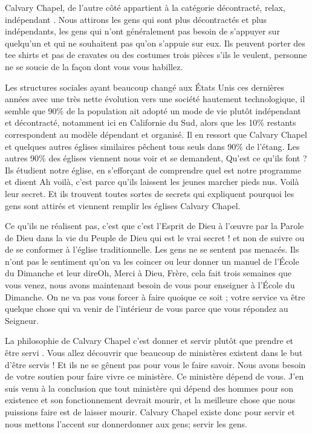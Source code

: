 Calvary Chapel, de l’autre côté appartient à la catégorie \og décontracté, relax, indépendant \fg{}. Nous attirons les gens qui
sont plus décontractés et plus indépendants, les gens qui n’ont généralement pas besoin de s’appuyer sur quelqu’un
et qui ne souhaitent pas qu’on s’appuie sur eux. Ils peuvent porter des tee shirts et pas de cravates ou des costumes
trois pièces s’ils le veulent, personne ne se soucie de la façon dont vous vous habillez.

Les structures sociales ayant beaucoup changé aux États Unis ces dernières années avec une très nette évolution vers
une société hautement technologique, il semble que 90\% de la population ait adopté un mode de vie plutôt
indépendant et décontracté, notamment ici en Californie du Sud, alors que les 10\% restants correspondent au modèle
dépendant et organisé. Il en ressort que Calvary Chapel et quelques autres églises similaires pêchent tous seuls dans
90\% de l'étang. Les autres 90\% des églises viennent nous voir et se demandent, \og Qu’est ce qu’ils font ?\fg{} Ils étudient
notre église, en s’efforçant de comprendre quel est notre programme et disent \og Ah voilà, c’est parce qu’ils laissent les
jeunes marcher pieds nus. Voilà leur secret. \fg{} Et ils trouvent toutes sortes de \og secrets\fg{} qui expliquent pourquoi les
gens sont attirés et viennent remplir les églises Calvary Chapel.

Ce qu’ils ne réalisent pas, c’est que c’est l’Esprit de Dieu à l’œuvre par la Parole de Dieu dans la vie du Peuple de Dieu
qui est le vrai secret ! et non de suivre ou de se conformer à l’église traditionnelle. Les gens ne se sentent pas
menacés. Ils n’ont pas le sentiment qu’on va les coincer ou leur donner un manuel de l’École du Dimanche et leur
dire\frcolon\og Oh, Merci à Dieu, Frère, cela fait trois semaines que vous venez, nous avons maintenant besoin de vous pour
enseigner à l’École du Dimanche.\fg{} On ne va pas vous forcer à faire quoique ce soit ; votre service va être quelque
chose qui va venir de l'intérieur de vous parce que vous répondez au Seigneur.

La philosophie de Calvary Chapel c’est \og donner et servir \fg{} plutôt que \og prendre et être servi \fg{}. Vous allez découvrir
que beaucoup de ministères existent dans le but d’être servis ! Et ils ne se gênent pas pour vous le faire savoir. \og Nous
avons besoin de votre soutien pour faire vivre ce ministère. Ce ministère dépend de vous.\fg{} J’en suis venu à la
conclusion que tout ministère qui dépend des hommes pour son existence et son fonctionnement devrait mourir, et la
meilleure chose que nous puissions faire est de laisser mourir. Calvary Chapel existe donc pour servir et nous mettons
l’accent sur donner\frcolon donner aux gens; servir les gens.

